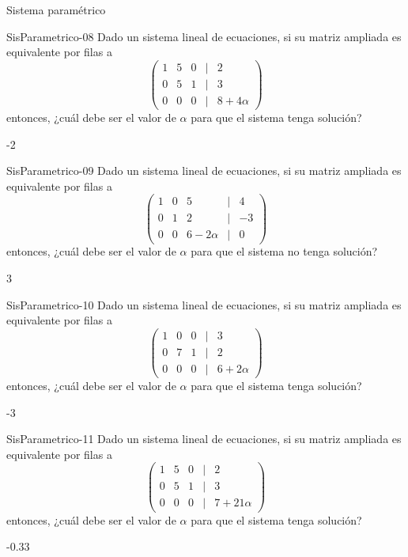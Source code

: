 \documentclass[a4,11pt]{aleph-notas}
\begin{document}
\begin{quiz}{Sistema paramétrico}
\begin{numerical}[tolerance=0.01]%
    {SisParametrico-08}
    Dado un sistema lineal de ecuaciones, si su matriz ampliada es equivalente por filas a 
    \[
    \begin{pmatrix}
    1 & 5 & 0 & | & 2 \\
    0 & 5 & 1 & | & 3 \\
    0 & 0 & 0 & | & 8+4\alpha
    \end{pmatrix}
    \]
    entonces, ¿cuál debe ser el valor de $\alpha$ para que el sistema tenga solución?
    \item -2
\end{numerical}

\begin{numerical}[tolerance=0.01]%
    {SisParametrico-09}
    Dado un sistema lineal de ecuaciones, si su matriz ampliada es equivalente por filas a 
    \[
    \begin{pmatrix}
    1 & 0 & 5 & | & 4 \\
    0 & 1 & 2 & | & -3 \\
    0 & 0 & 6-2\alpha & | & 0
    \end{pmatrix}
    \]
    entonces, ¿cuál debe ser el valor de $\alpha$ para que el sistema no tenga solución?
    \item 3
\end{numerical}

\begin{numerical}[tolerance=0.01]%
    {SisParametrico-10}
    Dado un sistema lineal de ecuaciones, si su matriz ampliada es equivalente por filas a 
    \[
    \begin{pmatrix}
    1 & 0 & 0 & | & 3 \\
    0 & 7 & 1 & | & 2 \\
    0 & 0 & 0 & | & 6+2\alpha
    \end{pmatrix}
    \]
    entonces, ¿cuál debe ser el valor de $\alpha$ para que el sistema tenga solución?
    \item -3
\end{numerical}

\begin{numerical}[tolerance=0.01]%
    {SisParametrico-11}
    Dado un sistema lineal de ecuaciones, si su matriz ampliada es equivalente por filas a 
    \[
    \begin{pmatrix}
    1 & 5 & 0 & | & 2 \\
    0 & 5 & 1 & | & 3 \\
    0 & 0 & 0 & | & 7+21\alpha
    \end{pmatrix}
    \]
    entonces, ¿cuál debe ser el valor de $\alpha$ para que el sistema tenga solución?
    \item -0.33
\end{numerical}


\end{quiz}
\end{document}
